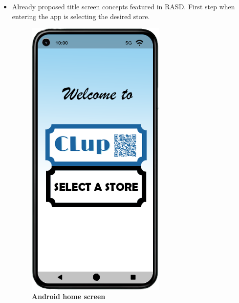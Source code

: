 \begin{itemize}
\item Already proposed title screen concepts featured in RASD. First step when entering the app is selecting the desired store.
\begin{figure}[!htb]
\centering
\begin{minipage}{0.4\textwidth}
\centering
\includegraphics[width=0.65\textwidth]{Images/App/Android_HomeScreenv2}
\caption{\label{fig:androidhomescreen}\textbf{Android home screen}}
\end{minipage}
\begin{minipage}{0.4\textwidth}
\centering

\end{minipage}
\end{figure}
\end{itemize}
